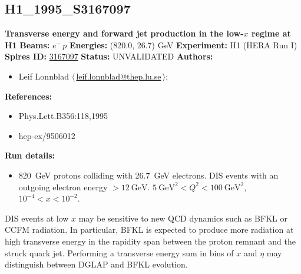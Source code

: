 \clearpage


\clearpage

\subsection[H1\_1995\_S3167097]{H1\_1995\_S3167097\,\cite{Aid:1995we}}
\textbf{Transverse energy and forward jet production in the low-$x$ regime at H1}\newline
\textbf{Beams:} $e^-$\,$p$ \newline
\textbf{Energies:} (820.0, 26.7) GeV \newline
\textbf{Experiment:} H1 (HERA Run I) \newline
\textbf{Spires ID:} \href{http://www.slac.stanford.edu/spires/find/hep/www?rawcmd=key+3167097}{3167097}\newline
\textbf{Status:} UNVALIDATED\newline
\textbf{Authors:}
\begin{itemize}
  \item Leif Lonnblad $\langle\,$\href{mailto:leif.lonnblad@thep.lu.se}{leif.lonnblad@thep.lu.se}$\,\rangle$;
\end{itemize}
\textbf{References:}
\begin{itemize}
  \item Phys.Lett.B356:118,1995
  \item hep-ex/9506012
\end{itemize}
\textbf{Run details:}
\begin{itemize}

  \item 820~GeV protons colliding with 26.7~GeV electrons. DIS events with an outgoing electron energy $> 12~\text{GeV}$. $5~\text{GeV}^2 < Q^2 < 100~\text{GeV}^2$, $10^{-4} < x < 10^{-2}$.\end{itemize}

\noindent DIS events at low $x$ may be sensitive to new QCD dynamics such as BFKL or CCFM radiation. In particular, BFKL is expected to produce more radiation at high transverse energy  in the rapidity span between the proton remnant and the struck quark jet. Performing a transverse energy sum in bins of $x$ and $\eta$ may distinguish between DGLAP and BFKL evolution.

\clearpage


\clearpage

